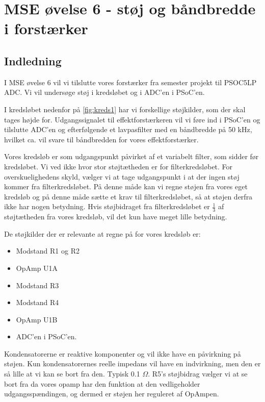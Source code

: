 \documentclass[a4paper, 11pt, article,oneside,openany]{memoir} %
\begin{document}
	
\chapter{MSE øvelse 6 - støj og båndbredde i forstærker}

\section{Indledning}
I MSE øvelse 6 vil vi tilslutte vores forstærker fra semester projekt til PSOC5LP ADC. Vi vil undersøge støj i kredsløbet og i ADC'en i PSoC'en.

I kredsløbet nedenfor på \cref{fig:kreds1} har vi forskellige støjkilder, som der skal tages højde for. Udgangssignalet til effektforstærkeren vil vi føre ind i PSoC'en og tilslutte ADC'en og efterfølgende et lavpasfilter med en båndbredde på 50 kHz, hvilket ca. vil svare til båndbredden for vores effektforstærker.

Vores kredsløb er som udgangspunkt påvirket af et variabelt filter, som sidder før kredsløbet. Vi ved ikke hvor stor støjtætheden er for filterkredsløbet. For overskuelighedens skyld, vælger vi at tage udgangspunkt i at der ingen støj kommer fra filterkredsløbet. På denne måde kan vi regne støjen fra vores eget kredsløb og på denne måde sætte et krav til filterkredsløbet, så at støjen derfra ikke har nogen betydning. Hvis støjbidraget fra filterkredsløbet er $\frac{1}{3}$ af støjtætheden fra vores kredsløb, vil det kun have meget lille betydning.

De støjkilder der er relevante at regne på for vores kredsløb er:

\begin{itemize}
	\item Modstand R1 og R2
	\item OpAmp U1A
	\item Modstand R3
	\item Modstand R4
	\item OpAmp U1B
	\item ADC'en i PSoC'en.	
\end{itemize}

Kondensatorerne er reaktive komponenter og vil ikke have en påvirkning på støjen. Kun kondensatorernes reelle impedans vil have en indvirkning, men den er så lille at vi kan se bort fra den. Typisk 0.1 $\Omega$.
R5's støjbidrag vælger vi at se bort fra da vores opamp har den funktion at den vedligeholder udgangsspændingen, og dermed er støjen her reguleret af OpAmpen.
\end{document}

